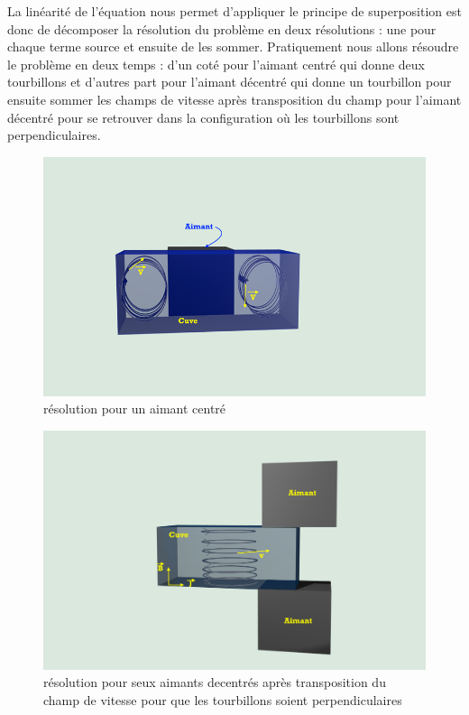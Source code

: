 \documentclass[a4paper,12pt,titlepage]{report}
\begin{document}
\begin{onehalfspace}
La linéarité de l'équation nous permet d'appliquer le principe de superposition est donc de décomposer la résolution du problème en deux résolutions : une pour chaque terme source et ensuite de les sommer.
Pratiquement nous allons résoudre le problème en deux temps : d'un coté pour l'aimant centré qui donne deux tourbillons et d'autres part pour l'aimant décentré qui donne un tourbillon pour ensuite sommer les champs de vitesse après transposition du champ pour l'aimant décentré pour se retrouver dans la configuration où les tourbillons sont perpendiculaires.
\begin{figure}[!h]
	\begin{center}
	\includegraphics[height = 8 cm, keepaspectratio]{graphes/config_centre.png}
	\caption{résolution pour un aimant centré}
	\label{figure 1k}
	\end{center}
\end{figure}
\begin{figure}[!h]
	\begin{center}
	\includegraphics[height = 8 cm, keepaspectratio]{graphes/champvec2.png}
	\caption{résolution pour seux aimants decentrés après transposition du champ de vitesse pour que les tourbillons soient perpendiculaires}
	\label{figure 1h}
	\end{center}
\end{figure}
\newpage

\end{onehalfspace}
\end{document}
